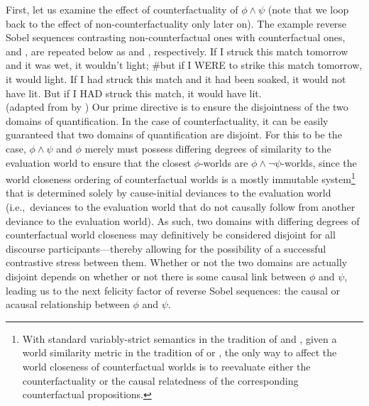 First, let us examine the effect of counterfactuality of $\phi\land\psi$ (note that we loop back to the effect of non-counterfactuality only later on). The example reverse Sobel sequences contrasting non-counterfactual ones with counterfactual ones,  and , are repeated below as  and , respectively.
\ex{}
    If I struck this match tomorrow and it was wet, it wouldn't light; \#but if I \MakeUppercase{were} to strike this match tomorrow, it would light.
\xe
\ex{}If I had struck this match and it had been soaked, it would not have lit. But if I \MakeUppercase{had} struck this match, it would have lit.\\%
\emptyfill(adapted from \textcite[p.~106]{Stalnaker1968} by \textcite[p.~487]{Lewis2018})
\xe
Our prime directive is to ensure the disjointness of the two domains of quantification. In the case of counterfactuality, it can be easily guaranteed that two domains of quantification are disjoint. For this to be the case, $\phi\land\psi$ and $\phi$ merely must possess differing degrees of similarity to the evaluation world to ensure that the closest $\phi$-worlds are $\phi\land\neg\psi$-worlds, since the world closeness ordering of counterfactual worlds is a mostly immutable system\footnote{With standard variably-strict semantics in the tradition of \textcite{Stalnaker1968} and \textcite{Lewis1973}, given a world similarity metric in the tradition of \textcite{Bennett2003} or \textcite{Arregui2009}, the only way to affect the world closeness of counterfactual worlds is to reevaluate either the counterfactuality or the causal relatedness of the corresponding counterfactual propositions.} that is determined solely by cause-initial deviances to the evaluation world (i.e.,~deviances to the evaluation world that do not causally follow from another deviance to the evaluation world). As such, two domains with differing degrees of counterfactual world closeness may definitively be considered disjoint for all discourse participants---thereby allowing for the possibility of a successful contrastive stress between them. Whether or not the two domains are actually disjoint depends on whether or not there is some causal link between $\phi$ and $\psi$, leading us to the next felicity factor of reverse Sobel sequences: the causal or acausal relationship between $\phi$ and $\psi$.

